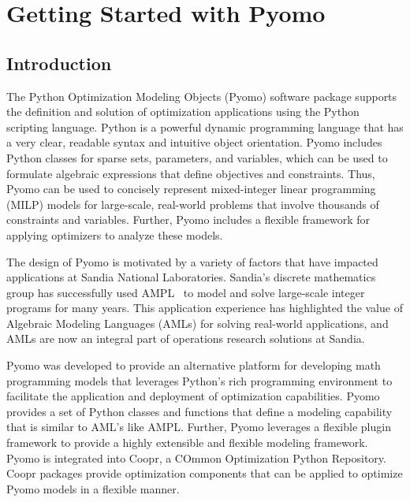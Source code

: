 
\chapter{Getting Started with Pyomo}

\label{sec:intro}

\section{Introduction}

The Python Optimization Modeling Objects (Pyomo) software package
supports the definition and solution of optimization applications using
the Python scripting language.  Python is a powerful dynamic programming
language that has a very clear, readable syntax and intuitive object
orientation.  Pyomo includes Python classes for sparse sets, parameters,
and variables, which can be used to formulate algebraic expressions that
define objectives and constraints.  Thus, Pyomo can be used to concisely
represent mixed-integer linear programming (MILP) models for large-scale,
real-world problems that involve thousands of constraints and variables.
Further, Pyomo includes a flexible framework for applying optimizers to
analyze these models.

The design of Pyomo is motivated by a variety of factors that have
impacted applications at Sandia National Laboratories.  Sandia's discrete
mathematics group has successfully used AMPL~\citep{AMPL,FouGay03}
to model and solve large-scale integer programs for many years.
This application experience has highlighted the value of Algebraic
Modeling Languages (AMLs) for solving real-world applications, and AMLs
are now an integral part of operations research solutions at Sandia.

Pyomo was developed to provide an alternative platform for developing math
programming models that leverages Python's rich programming environment to
facilitate the application and deployment of optimization capabilities.
Pyomo provides a set of Python classes and functions that define a
modeling capability that is similar to AML's like AMPL.  Further, Pyomo
leverages a flexible plugin framework to provide a highly extensible and
flexible modeling framework.  Pyomo is integrated into Coopr, a COmmon
Optimization Python Repository.  Coopr packages provide optimization
components that can be applied to optimize Pyomo models in a flexible
manner.


